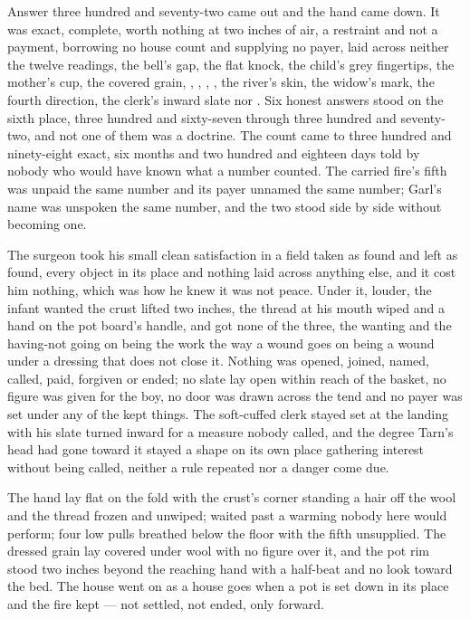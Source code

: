 Answer three hundred and seventy-two came out and the hand came down. It was exact, complete, worth nothing at two inches of air, a restraint and not a payment, borrowing no house count and supplying no payer, laid across neither the twelve readings, the bell's gap, the flat knock, the child's grey fingertips, the mother's cup, the covered grain, , , , , the river's skin, the widow's mark, the fourth direction, the clerk's inward slate nor . Six honest answers stood on the sixth place, three hundred and sixty-seven through three hundred and seventy-two, and not one of them was a doctrine. The count came to three hundred and ninety-eight exact, six months and two hundred and eighteen days told by nobody who would have known what a number counted. The carried fire's fifth was unpaid the same number and its payer unnamed the same number; Garl's name was unspoken the same number, and the two stood side by side without becoming one.

The surgeon took his small clean satisfaction in a field taken as found and left as found, every object in its place and nothing laid across anything else, and it cost him nothing, which was how he knew it was not peace. Under it, louder, the infant wanted the crust lifted two inches, the thread at his mouth wiped and a hand on the pot board's handle, and got none of the three, the wanting and the having-not going on being the work the way a wound goes on being a wound under a dressing that does not close it. Nothing was opened, joined, named, called, paid, forgiven or ended; no slate lay open within reach of the basket, no figure was given for the boy, no door was drawn across the tend and no payer was set under any of the kept things. The soft-cuffed clerk stayed set at the landing with his slate turned inward for a measure nobody called, and the degree Tarn's head had gone toward it stayed a shape on its own place gathering interest without being called, neither a rule repeated nor a danger come due.

The hand lay flat on the fold with the crust's corner standing a hair off the wool and the thread frozen and unwiped;  waited past a warming nobody here would perform; four low pulls breathed below the floor with the fifth unsupplied. The dressed grain lay covered under wool with no figure over it, and the pot rim stood two inches beyond the reaching hand with a half-beat and no look toward the bed. The house went on as a house goes when a pot is set down in its place and the fire kept — not settled, not ended, only forward.
